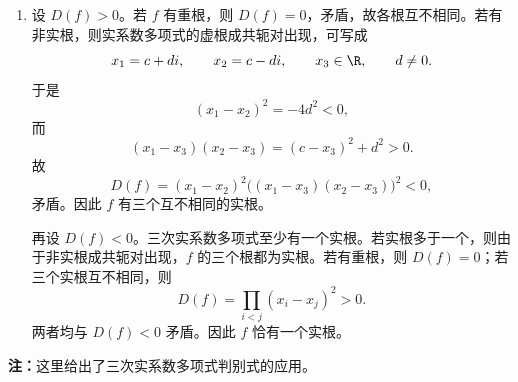 \begin{solution}
\begin{enumerate}
		\item 设 \(D(f)>0\)。若 \(f\) 有重根，则 \(D(f)=0\)，矛盾，故各根互不相同。若有非实根，则实系数多项式的虚根成共轭对出现，可写成
		\[
		x_1=c+di,
		\qquad x_2=c-di,
		\qquad x_3\in\R,
		\qquad d\ne0.
		\]
		于是
		\[
		(x_1-x_2)^2=-4d^2<0,
		\]
		而
		\[
		(x_1-x_3)(x_2-x_3)=(c-x_3)^2+d^2>0.
		\]
		故
		\[
		D(f)=(x_1-x_2)^2\bigl((x_1-x_3)(x_2-x_3)\bigr)^2<0,
		\]
		矛盾。因此 \(f\) 有三个互不相同的实根。
		
		再设 \(D(f)<0\)。三次实系数多项式至少有一个实根。若实根多于一个，则由于非实根成共轭对出现，\(f\) 的三个根都为实根。若有重根，则 \(D(f)=0\)；若三个实根互不相同，则
		\[
		D(f)=\prod_{i<j}(x_i-x_j)^2>0.
		\]
		两者均与 \(D(f)<0\) 矛盾。因此 \(f\) 恰有一个实根。
	\end{enumerate}
	
	\textbf{注：}这里给出了三次实系数多项式判别式的应用。
\end{solution}












































































